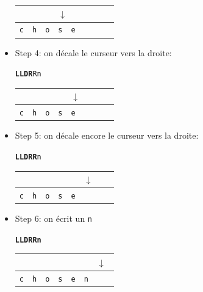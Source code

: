 \begin{itemize}
\begin{center}
\begin{tabular}{|l|l|l|l|l|l|l|l}
\multicolumn{3}{l}{} & \multicolumn{5}{l}{$\downarrow$} \\
\hline
\verb+c+ & \verb+h+ & \verb+o+ & \verb+s+ & \verb+e+ & \verb+ + & \verb+ + & \\
\hline
\end{tabular}
\end{center}

\bigskip
\item Step 4: on décale le curseur vers la droite:

\begin{center}
\texttt{\textbf{LLDR}Rn}

\begin{tabular}{|l|l|l|l|l|l|l|l}
\multicolumn{4}{l}{} & \multicolumn{4}{l}{$\downarrow$} \\
\hline
\verb+c+ & \verb+h+ & \verb+o+ & \verb+s+ & \verb+e+ & \verb+ + & \verb+ + & \\
\hline
\end{tabular}
\end{center}

\bigskip
\item Step 5: on décale encore le curseur vers la droite:

\begin{center}
\texttt{\textbf{LLDRR}n}

\begin{tabular}{|l|l|l|l|l|l|l|l}
\multicolumn{5}{l}{} & \multicolumn{3}{l}{$\downarrow$} \\
\hline
\verb+c+ & \verb+h+ & \verb+o+ & \verb+s+ & \verb+e+ & \verb+ + & \verb+ + & \\
\hline
\end{tabular}
\end{center}

\bigskip
\item Step 6: on écrit un \verb+n+

\begin{center}
\texttt{\textbf{LLDRRn}}

\begin{tabular}{|l|l|l|l|l|l|l|l}
\multicolumn{6}{l}{} & \multicolumn{2}{l}{$\downarrow$} \\
\hline
\verb+c+ & \verb+h+ & \verb+o+ & \verb+s+ & \verb+e+ & \verb+n+ & \verb+ + & \\
\hline
\end{tabular}
\end{center}
\end{itemize}

